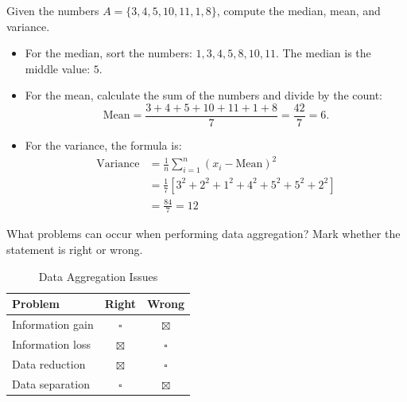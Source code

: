 \documentclass[12pt]{article}
\begin{document}
    \begin{ejercicio}
        Given the numbers $A = \{3, 4, 5, 10, 11, 1, 8\}$, compute the median, mean, and variance.
        \begin{itemize}
            \item For the median, sort the numbers: $1, 3, 4, 5, 8, 10, 11$. The median is the middle value: $5$.
            \item For the mean, calculate the sum of the numbers and divide by the count:
            \[ \text{Mean} = \frac{3 + 4 + 5 + 10 + 11 + 1 + 8}{7} = \frac{42}{7} = 6. \]
            \item For the variance, the formula is:
            \begin{align*}
                \text{Variance} &= \frac{1}{n} \sum_{i=1}^{n} (x_i - \text{Mean})^2 \\
                &= \frac{1}{7} \left[3^2+2^2+1^2+4^2+5^2+5^2+2^2\right] \\
                &= \frac{84}{7}= 12
            \end{align*}
        \end{itemize}
    \end{ejercicio}

    \begin{ejercicio}
        What problems can occur when performing data aggregation? Mark whether the statement is right or wrong.

        \begin{table}[h!]
        \centering
        \begin{tabular}{lcc}
        \hline
        \textbf{Problem} & \textbf{Right} & \textbf{Wrong} \\ \hline
        Information gain & $\square$ & $\boxtimes$ \\
        Information loss & $\boxtimes$ & $\square$ \\
        Data reduction & $\boxtimes$ & $\square$ \\
        Data separation & $\square$ & $\boxtimes$ \\ \hline
        \end{tabular}
        \caption{Data Aggregation Issues}
        \label{tab:aggregation_issues2}
        \end{table}
    \end{ejercicio}
\end{document}
